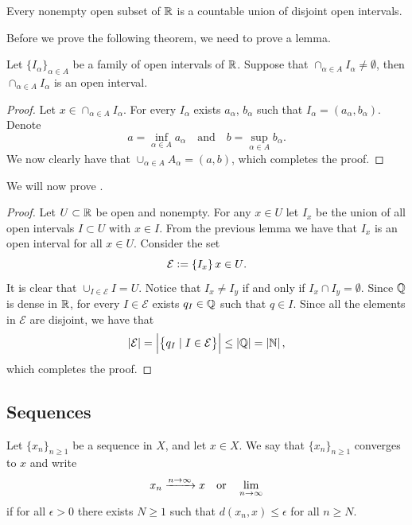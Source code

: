 \documentclass[11pt,a4paper]{article}
\begin{document}
\begin{theorem}\label{thm:open-are-intervals}
  Every nonempty open subset of $\mathbb{R}$ is a countable union of disjoint
  open intervals.
\end{theorem}
Before we prove the following theorem, we need to prove a lemma.
\begin{lemma}
  Let $\{I_\alpha\}_{\alpha \in A}$ be a family of open intervals of $\mathbb{R}$.
  Suppose that $\cap_{\alpha \in A} I_\alpha \neq \emptyset$, then 
  $\cap_{\alpha \in A} I_\alpha$ is an open interval.
\end{lemma}
\begin{proof}
  Let $x \in \cap_{\alpha \in A} I_\alpha$. For every $I_\alpha$ exists 
  $a_\alpha$, $b_\alpha$ such that $I_\alpha = (a_\alpha,b_\alpha)$.
  Denote
  \[
    a = \inf_{\alpha \in A} a_\alpha \quad \text{and} \quad
    b = \sup_{\alpha \in A} b_\alpha.
  \]
  We now clearly have that $\cup_{\alpha \in A} A_\alpha = (a,b)$, 
  which completes the proof.
\end{proof}
We will now prove .
\begin{proof}
  Let $U \subset \mathbb{R}$ be open and nonempty.
  For any $x \in U$ let $I_x$ be the union of all open intervals $I \subset U$
  with $x \in I$.
  From the previous lemma we have that $I_x$ is an open interval for all
  $x \in U$. Consider the set
  \[
    \mathcal{E} := \left\{I_x\right\}{x \in U}.
  \]
  It is clear that $\cup_{I \in \mathcal E} I = U$.
  Notice that $I_x \neq I_y$ if and only if $I_x \cap I_y = \emptyset$.
  Since $\mathbb{Q}$ is dense in $\mathbb{R}$, for every $I \in \mathcal E$ exists 
  $q_I \in \mathbb{Q}$ such that $q \in I$. Since all the elements in $\mathcal E$
  are disjoint, we have that
  \[
    \left\lvert\mathcal E\right\rvert=
    \left\lvert\left\{q_I \mid I \in \mathcal E\right\}\right\rvert \le
    \left\lvert\mathbb{Q}\right\rvert =
    \left\lvert\mathbb{N}\right\rvert,
  \]
  which completes the proof.
\end{proof}

\subsection{Sequences}

\begin{definition}[Convergence]
  Let $\{x_n\}_{n \geq 1}$ be a sequence in $X$, and let $x \in X$.
  We say that $\{x_n\}_{n \geq 1}$ converges to $x$ and write
  \[
    x_n \xrightarrow{n \to \infty} x \quad \text{or} \quad \lim_{n \to \infty}
  \]
  if for all $\epsilon > 0$ there exists $N \geq 1$ such that
  $d(x_n,x) \le \epsilon$ for all $n \geq N$.
\end{definition}
\end{document}
